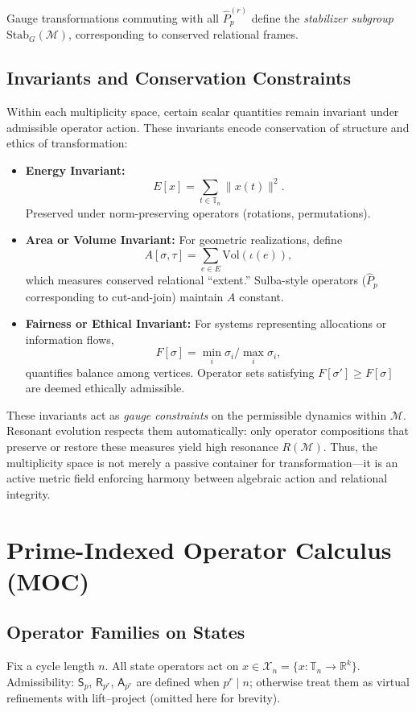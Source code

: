 \documentclass[12pt]{article}
\numberwithin{equation}{section}
\theoremstyle{plain}
\theoremstyle{definition}
\theoremstyle{remark}
\begin{document}
Gauge transformations commuting with all \(\hat{P}_p^{(r)}\) define the \emph{stabilizer subgroup} \(\mathrm{Stab}_G(\mathcal{M})\), corresponding to conserved relational frames.

\subsection*{Invariants and Conservation Constraints}
Within each multiplicity space, certain scalar quantities remain invariant under admissible operator action. These invariants encode conservation of structure and ethics of transformation:
\begin{itemize}
  \item \textbf{Energy Invariant:}  
  \[
  E[x] = \sum_{t\in\mathbb{T}_n} \|x(t)\|^2.
  \]
  Preserved under norm-preserving operators (rotations, permutations).

  \item \textbf{Area or Volume Invariant:}  
  For geometric realizations, define  
  \[
  A[\sigma,\tau] = \sum_{e\in E} \mathrm{Vol}(\iota(e)),
  \]
  which measures conserved relational “extent.” Sulba-style operators (\(\hat{P}_p\) corresponding to cut-and-join) maintain \(A\) constant.

  \item \textbf{Fairness or Ethical Invariant:}  
  For systems representing allocations or information flows,
  \[
  F[\sigma] = \min_i \sigma_i / \max_i \sigma_i,
  \]
  quantifies balance among vertices. Operator sets satisfying \(F[\sigma']\ge F[\sigma]\) are deemed ethically admissible.

\end{itemize}

These invariants act as \emph{gauge constraints} on the permissible dynamics within \(\mathcal{M}\). Resonant evolution respects them automatically: only operator compositions that preserve or restore these measures yield high resonance \(R(\mathcal{M})\). Thus, the multiplicity space is not merely a passive container for transformation—it is an active metric field enforcing harmony between algebraic action and relational integrity.

\section*{Prime-Indexed Operator Calculus (MOC)}

\subsection*{Operator Families on States}
Fix a cycle length \(n\). All state operators act on \(x\in\mathcal{X}_n=\{x:\mathbb{T}_n\to\mathbb{R}^k\}\).
Admissibility: \(\mathsf{S}_p\), \(\mathsf{R}_{p^r}\), \(\mathsf{A}_{p^r}\) are defined when \(p^r\mid n\); otherwise treat them as virtual refinements with lift–project (omitted here for brevity).
\end{document}
